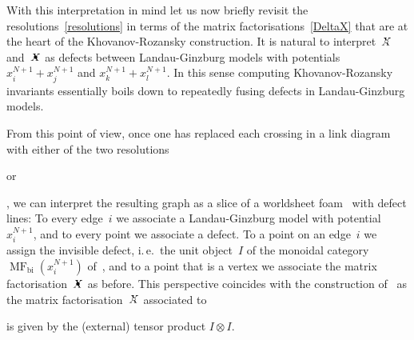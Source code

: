 \documentclass{compositio}
\theoremstyle{definition}
\numberwithin{equation}{section}
\begin{document}
With this interpretation in mind let us now briefly revisit the resolutions~\eqref{resolutions} in terms of the matrix factorisations~\eqref{DeltaX} that are at the heart of the Khovanov-Rozansky construction. It is natural to interpret~$\Xcirc$ and~$\Xbul$ as defects between Landau-Ginzburg models with potentials $x^{N+1}_{i}+x^{N+1}_{j}$ and $x^{N+1}_{k}+x^{N+1}_{l}$. In this sense computing Khovanov-Rozansky invariants essentially boils down to repeatedly fusing defects in Landau-Ginzburg models. 

From this point of view, once one has replaced each crossing in a link diagram with either of the two resolutions 
\begin{minipage}{0.36cm}
\end{minipage}
 or 
 \begin{minipage}{0.36cm}
\end{minipage}
, we can interpret the resulting graph as a slice of a worldsheet foam~\cite{kr0404189, msv0708.2228} with defect lines: To every edge~$i$ we associate a Landau-Ginzburg model with potential $x_{i}^{N+1}$, and to every point we associate a defect. To a point on an edge~$i$ we assign the invisible defect, i.\,e.~the unit object~$I$ of the monoidal category $\operatorname{MF}_{\text{bi}}(x_{i}^{N+1})$ of~\cite{cr0909.4381}, and to a point that is a vertex we associate the matrix factorisation~$\Xbul$ as before. This perspective coincides with the construction of~\cite{kr0401268} as the matrix factorisation~$\Xcirc$ associated to 
\begin{minipage}{0.3cm}
\end{minipage}
 is given by the (external) tensor product $I\otimes I$. 
\end{document}
